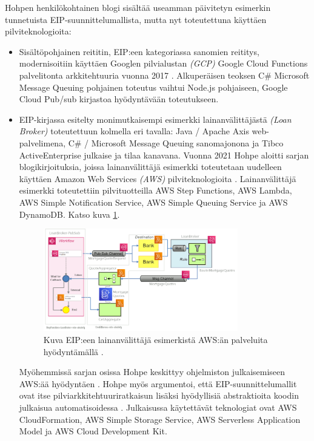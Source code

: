    Hohpen henkilökohtainen blogi sisältää useamman päivitetyn esimerkin tunnetuista EIP-suunnittelumallista, mutta nyt toteutettuna käyttäen pilviteknologioita: 
   \begin{itemize}
      \item Sisältöpohjainen reititin, EIP:een kategoriassa sanomien reititys, modernisoitiin käyttäen Googlen pilvialustan \textit{(GCP)} Google Cloud Functions palvelitonta arkkitehtuuria vuonna 2017 \citep{HohpeEIPGCP}. Alkuperäisen teoksen C\# Microsoft Message Queuing pohjainen toteutus vaihtui Node.js pohjaiseen, Google Cloud Pub/sub kirjastoa hyödyntävään toteutukseen.
   \item EIP-kirjassa esitelty monimutkaisempi esimerkki lainanvälittäjästä \textit{(Loan Broker)} \citep[sivu~317]{Hohpe2004} toteutettuun kolmella eri tavalla: Java / Apache Axis web-palvelimena, C\# / Microsoft Message Queuing sanomajonona ja Tibco ActiveEnterprise julkaise ja tilaa kanavana. Vuonna 2021 Hohpe aloitti sarjan blogikirjoituksia, joissa lainanvälittäjä esimerkki toteutetaan uudelleen käyttäen Amazon Web Services \textit{(AWS)} pilviteknologioita \citep{HohpeLoanAWS}.
      Lainanvälittäjä esimerkki toteutettiin pilvituotteilla AWS Step Functions, AWS Lambda, AWS Simple Notification Service, AWS Simple Queuing Service ja AWS DynamoDB. Katso kuva \ref{fig:hohpe_loanbroker_4}.

      \begin{figure}[h]
      \begin{center}
      \includegraphics[width=0.8\textwidth]{kuvat/hohpe_loanbroker_4.png}
      \caption{Kuva EIP:een lainanvälittäjä esimerkistä AWS:än palveluita hyödyntämällä \citep{HohpeLoanAWS_4}\label{fig:hohpe_loanbroker_4}.}
      \end{center}
      \end{figure}


      Myöhemmissä sarjan osissa Hohpe keskittyy ohjelmiston julkaisemiseen AWS:ää hyödyntäen \citep{HohpeLoanAWS_4} \citep{HohpeLoanAWS_5}. Hohpe myös argumentoi, että EIP-suunnittelumallit ovat itse pilviarkkitehtuuriratkaisun lisäksi hyödyllisiä abstraktioita koodin julkaisua automatisoidessa \citep{HohpeLoanAWS_5}. Julkaisussa käytettävät teknologiat ovat AWS CloudFormation, AWS Simple Storage Service, AWS Serverless Application Model ja AWS Cloud Development Kit.


\end{itemize}
